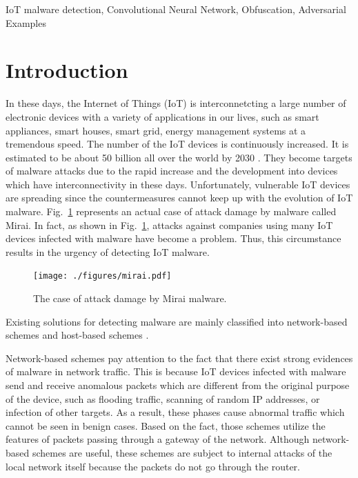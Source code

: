 \documentclass{ieeeaccess}
\newcommand{\myfigurename}{Fig.}
\begin{document}
\begin{keywords} 
 IoT malware detection, Convolutional Neural Network, Obfuscation, Adversarial Examples 
 \end{keywords}

\titlepgskip=-15pt

\maketitle

\section{Introduction}  \label{sec:introduction}
In these days, the Internet of Things (IoT) is interconnetcting a large number of electronic devices with a variety of applications in our lives, such as smart appliances, smart houses, smart grid, energy management systems at a tremendous speed.
The number of the IoT devices is continuously increased.
It is estimated to be about 50 billion all over the world by 2030 \cite{bg1, bg2}.
They become targets of malware attacks due to the rapid increase and the development into devices which have interconnectivity in these days.
Unfortunately, vulnerable IoT devices are spreading since the countermeasures cannot keep up with the evolution of IoT malware.
\myfigurename~\ref{fig:mirai} represents an actual case of attack damage by malware called Mirai.
In fact, as shown in \myfigurename~\ref{fig:mirai}, attacks against companies using many IoT devices infected with malware have become a problem.
Thus, this circumstance results in the urgency of detecting IoT malware.

\begin{figure}[t]
 \centering
 \texttt{[image: ./figures/mirai.pdf]}
 \caption{The case of attack damage by Mirai malware.} 
 \label{fig:mirai}
\end{figure}
Existing solutions for detecting malware are mainly classified into network-based schemes \cite{zako, diot, net} and host-based schemes \cite{om, hwang, cfg, cfg2, op-graph, func-graph, api-graph}.

Network-based schemes pay attention to the fact that there exist strong evidences of malware in network traffic.
This is because IoT devices infected with malware send and receive anomalous packets which are different from the original purpose of the device, such as flooding traffic, scanning of random IP addresses, or infection of other targets.
As a result, these phases cause abnormal traffic which cannot be seen in benign cases.
Based on the fact, those schemes utilize the features of packets passing through a gateway of the network.
Although network-based schemes are useful, these schemes are subject to internal attacks of the local network itself because the packets do not go through the router.
\end{document}
